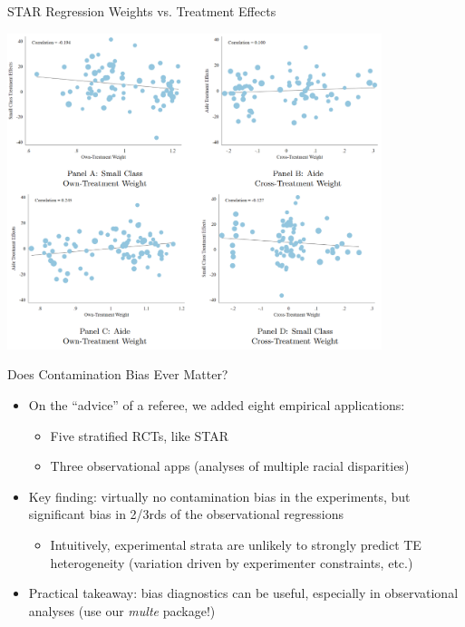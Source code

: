 \documentclass[11pt,english]{beamer}
\begin{document}
\begin{frame}{STAR Regression Weights vs. Treatment Effects}
\vspace{0.1cm}
\begin{center}
	\includegraphics[width=0.82\textwidth]{figures/STAR_Scatter.png}
\end{center}

\end{frame}

\begin{frame}{Does Contamination Bias Ever Matter?}
\begin{itemize}
\item On the ``advice'' of a referee, we added eight empirical applications:\smallskip
\begin{itemize}
\item Five stratified RCTs, like STAR \smallskip
\item Three observational apps (analyses of multiple racial disparities)
\end{itemize}\bigskip\pause{}
\item Key finding: virtually no contamination bias in the experiments, but significant bias in 2/3rds of the observational regressions\smallskip
\begin{itemize}
\item Intuitively, experimental strata are unlikely to strongly predict TE heterogeneity (variation driven by experimenter constraints, etc.)
\end{itemize}\bigskip\pause{}
\item Practical takeaway: bias diagnostics can be useful, especially in observational analyses (use our \emph{multe} package!)
\end{itemize}
\end{frame}
\end{document}
